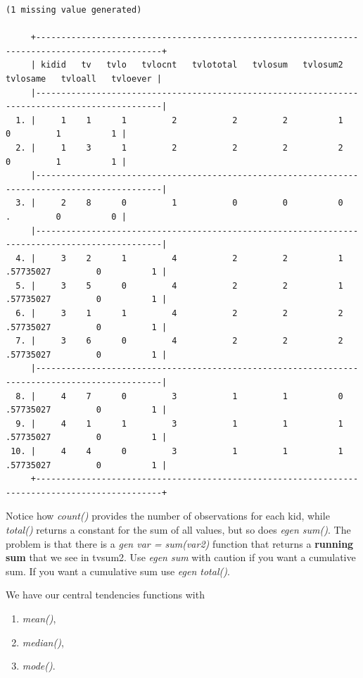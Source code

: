 \documentclass[
]{book}
\providecommand{\tightlist}{%
  \setlength{\itemsep}{0pt}\setlength{\parskip}{0pt}}
\begin{document}
\begin{verbatim}
(1 missing value generated)

     +-----------------------------------------------------------------------------------------------+
     | kidid   tv   tvlo   tvlocnt   tvlototal   tvlosum   tvlosum2    tvlosame   tvloall   tvloever |
     |-----------------------------------------------------------------------------------------------|
  1. |     1    1      1         2           2         2          1           0         1          1 |
  2. |     1    3      1         2           2         2          2           0         1          1 |
     |-----------------------------------------------------------------------------------------------|
  3. |     2    8      0         1           0         0          0           .         0          0 |
     |-----------------------------------------------------------------------------------------------|
  4. |     3    2      1         4           2         2          1   .57735027         0          1 |
  5. |     3    5      0         4           2         2          1   .57735027         0          1 |
  6. |     3    1      1         4           2         2          2   .57735027         0          1 |
  7. |     3    6      0         4           2         2          2   .57735027         0          1 |
     |-----------------------------------------------------------------------------------------------|
  8. |     4    7      0         3           1         1          0   .57735027         0          1 |
  9. |     4    1      1         3           1         1          1   .57735027         0          1 |
 10. |     4    4      0         3           1         1          1   .57735027         0          1 |
     +-----------------------------------------------------------------------------------------------+
\end{verbatim}

Notice how \emph{count()} provides the number of observations for each kid, while
\emph{total()} returns a constant for the sum of all values, but so does \emph{egen sum()}.
The problem is that there is a \emph{gen var = sum(var2)} function that returns
a \textbf{running sum} that we see in tvsum2. Use \emph{egen sum} with caution if you want a cumulative sum. If you want a cumulative sum use \emph{egen total()}.

We have our central tendencies functions with

\begin{enumerate}
\def\labelenumi{\arabic{enumi}.}
\tightlist
\item
  \emph{mean()},
\item
  \emph{median()},
\item
  \emph{mode()}.
\end{enumerate}
\end{document}
